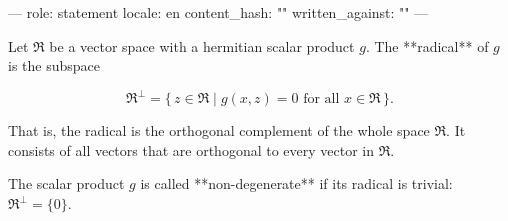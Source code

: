 ---
role: statement
locale: en
content_hash: ""
written_against: ""
---

Let $\mathfrak{R}$ be a vector space with a hermitian scalar product $g$. The **radical** of $g$ is the subspace

$$\mathfrak{R}^{\perp} = \{\, z \in \mathfrak{R} \mid g(x, z) = 0 \text{ for all } x \in \mathfrak{R} \,\}.$$

That is, the radical is the orthogonal complement of the whole space $\mathfrak{R}$. It consists of all vectors that are orthogonal to every vector in $\mathfrak{R}$.

The scalar product $g$ is called **non-degenerate** if its radical is trivial: $\mathfrak{R}^{\perp} = \{0\}$.
